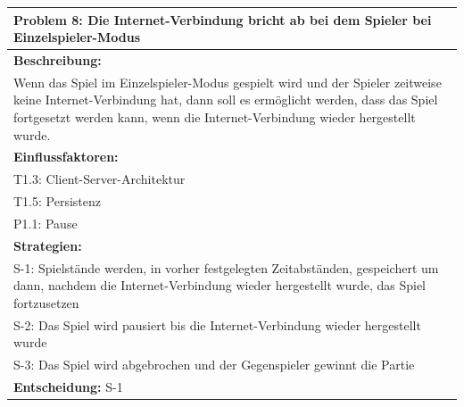 \documentclass[fontsize=12pt,paper=a4,twoside]{scrartcl}
\begin{document}
\begin{longtable}{|p{15cm}|}
\hline
Problem 8: Die Internet-Verbindung bricht ab bei dem Spieler bei Einzelspieler-Modus                                                                       
\\ \hline                                                                                                                                                                                                                                                                                                                                                                                                                                                                                                                                                        
\textbf{Beschreibung:} \\
Wenn das Spiel im Einzelspieler-Modus gespielt wird und der Spieler zeitweise keine Internet-Verbindung hat, 
dann soll es ermöglicht werden, dass das Spiel fortgesetzt werden kann, wenn die Internet-Verbindung wieder hergestellt wurde.
\\ \hline
\textbf{Einflussfaktoren:} \\
T1.3: Client-Server-Architektur \\
T1.5: Persistenz \\
P1.1: Pause
\\ \hline
\textbf{Strategien:} \\
S-1: Spielstände werden, in vorher festgelegten Zeitabständen, gespeichert um dann, nachdem die Internet-Verbindung wieder hergestellt wurde, das Spiel fortzusetzen\\
S-2: Das Spiel wird pausiert bis die Internet-Verbindung wieder hergestellt wurde \\
S-3: Das Spiel wird abgebrochen und der Gegenspieler gewinnt die Partie
 \\ \hline
 \textbf{Entscheidung:} S-1
\\ \hline
\end{longtable}
\newpage
\end{document}
